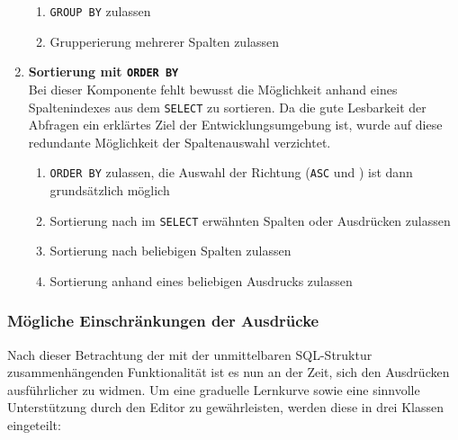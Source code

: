 \begin{enumerate}
  \begin{enumerate}
  \item \label{feat:group-allow} \texttt{GROUP BY} zulassen
  \item \label{feat:group-multiple} Grupperierung mehrerer Spalten zulassen
  \end{enumerate}
\item \textbf{Sortierung mit \texttt{ORDER BY}} \\
  Bei dieser Komponente fehlt bewusst die Möglichkeit anhand eines Spaltenindexes aus dem \texttt{SELECT} zu sortieren. Da die gute Lesbarkeit der Abfragen ein erklärtes Ziel der Entwicklungsumgebung ist, wurde auf diese redundante Möglichkeit der Spaltenauswahl verzichtet.
  \begin{enumerate}
  \item \label{feat:order-allow} \texttt{ORDER BY} zulassen, die Auswahl der Richtung (\texttt{ASC} und ) ist dann grundsätzlich möglich
  \item \label{feat:order-select} Sortierung nach im \texttt{SELECT} erwähnten Spalten oder Ausdrücken zulassen
  \item \label{feat:order-any-column} Sortierung nach beliebigen Spalten zulassen
  \item \label{feat:order-expression} Sortierung anhand eines beliebigen Ausdrucks zulassen
  \end{enumerate}
\end{enumerate}

\subsubsection{Mögliche Einschränkungen der Ausdrücke}
\label{sec:sql-subset-expression}

Nach dieser Betrachtung der mit der unmittelbaren SQL-Struktur zusammenhängenden Funktionalität ist es nun an der Zeit, sich den Ausdrücken ausführlicher zu widmen. Um eine graduelle Lernkurve sowie eine sinnvolle Unterstützung durch den Editor zu gewährleisten, werden diese in drei Klassen eingeteilt:

